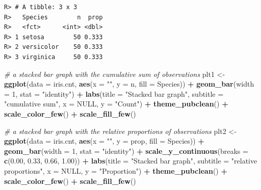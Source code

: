 \documentclass[english,10pt,a4paper,oneside]{book}
\newenvironment{Shaded}{\begin{snugshade}}{\end{snugshade}}
\newcommand{\CommentTok}[1]{\textcolor[rgb]{0.56,0.35,0.01}{\textit{#1}}}
\newcommand{\DataTypeTok}[1]{\textcolor[rgb]{0.13,0.29,0.53}{#1}}
\newcommand{\DecValTok}[1]{\textcolor[rgb]{0.00,0.00,0.81}{#1}}
\newcommand{\FloatTok}[1]{\textcolor[rgb]{0.00,0.00,0.81}{#1}}
\newcommand{\KeywordTok}[1]{\textcolor[rgb]{0.13,0.29,0.53}{\textbf{#1}}}
\newcommand{\NormalTok}[1]{#1}
\newcommand{\OperatorTok}[1]{\textcolor[rgb]{0.81,0.36,0.00}{\textbf{#1}}}
\newcommand{\OtherTok}[1]{\textcolor[rgb]{0.56,0.35,0.01}{#1}}
\newcommand{\StringTok}[1]{\textcolor[rgb]{0.31,0.60,0.02}{#1}}
\theoremstyle{definition}
\theoremstyle{definition}
\theoremstyle{definition}
\theoremstyle{remark}
\begin{document}
\begin{verbatim}
R> # A tibble: 3 x 3
R>   Species        n  prop
R>   <fct>      <int> <dbl>
R> 1 setosa        50 0.333
R> 2 versicolor    50 0.333
R> 3 virginica     50 0.333
\end{verbatim}

\begin{Shaded}
\begin{Highlighting}[]
\CommentTok{# a stacked bar graph with the cumulative sum of observations}
\NormalTok{plt1 <-}\StringTok{ }\KeywordTok{ggplot}\NormalTok{(}\DataTypeTok{data =}\NormalTok{ iris.cnt, }\KeywordTok{aes}\NormalTok{(}\DataTypeTok{x =} \StringTok{""}\NormalTok{, }\DataTypeTok{y =}\NormalTok{ n, }\DataTypeTok{fill =}\NormalTok{ Species)) }\OperatorTok{+}
\StringTok{  }\KeywordTok{geom_bar}\NormalTok{(}\DataTypeTok{width =} \DecValTok{1}\NormalTok{, }\DataTypeTok{stat =} \StringTok{"identity"}\NormalTok{) }\OperatorTok{+}
\StringTok{  }\KeywordTok{labs}\NormalTok{(}\DataTypeTok{title =} \StringTok{"Stacked bar graph"}\NormalTok{, }\DataTypeTok{subtitle =} \StringTok{"cumulative sum"}\NormalTok{,}
       \DataTypeTok{x =} \OtherTok{NULL}\NormalTok{, }\DataTypeTok{y =} \StringTok{"Count"}\NormalTok{) }\OperatorTok{+}
\StringTok{  }\KeywordTok{theme_pubclean}\NormalTok{() }\OperatorTok{+}\StringTok{ }\KeywordTok{scale_color_few}\NormalTok{() }\OperatorTok{+}
\StringTok{  }\KeywordTok{scale_fill_few}\NormalTok{()}

\CommentTok{# a stacked bar graph with the relative proportions of observations}
\NormalTok{plt2 <-}\StringTok{ }\KeywordTok{ggplot}\NormalTok{(}\DataTypeTok{data =}\NormalTok{ iris.cnt, }\KeywordTok{aes}\NormalTok{(}\DataTypeTok{x =} \StringTok{""}\NormalTok{, }\DataTypeTok{y =}\NormalTok{ prop, }\DataTypeTok{fill =}\NormalTok{ Species)) }\OperatorTok{+}
\StringTok{  }\KeywordTok{geom_bar}\NormalTok{(}\DataTypeTok{width =} \DecValTok{1}\NormalTok{, }\DataTypeTok{stat =} \StringTok{"identity"}\NormalTok{) }\OperatorTok{+}
\StringTok{  }\KeywordTok{scale_y_continuous}\NormalTok{(}\DataTypeTok{breaks =} \KeywordTok{c}\NormalTok{(}\FloatTok{0.00}\NormalTok{, }\FloatTok{0.33}\NormalTok{, }\FloatTok{0.66}\NormalTok{, }\FloatTok{1.00}\NormalTok{)) }\OperatorTok{+}
\StringTok{  }\KeywordTok{labs}\NormalTok{(}\DataTypeTok{title =} \StringTok{"Stacked bar graph"}\NormalTok{, }\DataTypeTok{subtitle =} \StringTok{"relative proportions"}\NormalTok{,}
       \DataTypeTok{x =} \OtherTok{NULL}\NormalTok{, }\DataTypeTok{y =} \StringTok{"Proportion"}\NormalTok{) }\OperatorTok{+}
\StringTok{  }\KeywordTok{theme_pubclean}\NormalTok{() }\OperatorTok{+}\StringTok{ }\KeywordTok{scale_color_few}\NormalTok{() }\OperatorTok{+}
\StringTok{  }\KeywordTok{scale_fill_few}\NormalTok{()}



\end{Highlighting}
\end{Shaded}
\end{document}
